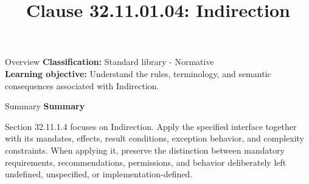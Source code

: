 \documentclass[10pt,letterpaper]{article}
\title{Clause 32.11.01.04: Indirection}
\author{}
\date{}
\begin{document}
\maketitle
\begin{CornellOverviewBox}{Overview}
\textbf{Classification:} Standard library - Normative\\[2pt]
\textbf{Learning objective:} Understand the rules, terminology, and semantic consequences associated with Indirection.
\end{CornellOverviewBox}\begin{CornellSummaryBox}{Summary}
{\sffamily\bfseries\color{Accent} Summary}\par\vspace{3pt}Section 32.11.1.4 focuses on Indirection. Apply the specified interface together with its mandates, effects, result conditions, exception behavior, and complexity constraints. When applying it, preserve the distinction between mandatory requirements, recommendations, permissions, and behavior deliberately left undefined, unspecified, or implementation-defined.
\end{CornellSummaryBox}
\end{document}
